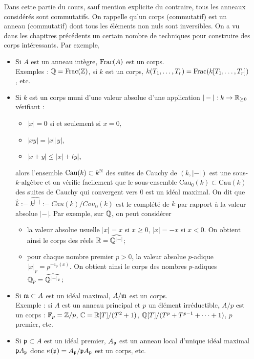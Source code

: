 \documentclass[a4paper, oneside, 12pt]{book}
\begin{document}
Dans cette partie du cours, sauf mention explicite du contraire, tous les anneaux considérés sont commutatifs. On rappelle qu'un corps (commutatif) est un anneau (commutatif) dont tous les éléments non nuls sont inversibles. On a vu dans les chapitres précédents un certain nombre de techniques pour construire des corps intéressants. Par exemple,
\begin{itemize}[leftmargin=* ,parsep=0cm,itemsep=0cm,topsep=0cm]
\item Si $A$ est un anneau intègre, $\operatorname{Frac}(A)$ est un corps.\\
Exemples : $\mathbb{Q}=\operatorname{Frac}(\mathbb{Z})$, si $k$ est un corps, $k(T_1,\dots, T_r)=\operatorname{Frac}(k[T_1,\dots, T_r])$, etc.
\item Si $k$ est un corps muni d'une valeur absolue \ie{} d'une
  application $|-|:k\rightarrow \mathbb{R}_{\geq 0}$ vérifiant :
  \begin{itemize}
  \item $|x|=0$ si et seulement si $x=0$,
  \item $|xy|=|x||y|$,
  \item $|x+y|\leq |x|+ly|$,
  \end{itemize}
  alors l'ensemble $\mathrm{Cau}(k)\subset k^{\mathbb{N}}$ des suites de Cauchy
  de $(k,|-|)$ est une sous-$k$-algèbre et on vérifie facilement que
  le sous-ensemble $\mathrm{Cau}_0(k)\subset \mathrm{Cau}(k)$ des
  suites de Cauchy qui convergent vers $0$ est un idéal maximal. On
  dit que $\widehat{k}:=\widehat{k^{|-|}}:=Cau(k)/Cau_0(k)$ est le
  complété de $k$ par rapport à la valeur absolue $|-|$. Par exemple,
  sur $\mathbb{Q}$, on peut considérer
\begin{itemize}[leftmargin=* ,parsep=0cm,itemsep=0cm,topsep=0cm]
\item la valeur absolue usuelle $|x|=x$ si $x\geq 0$, $|x|=-x$ si $x<0$. On obtient ainsi le corps des réels $\mathbb{R}=\widehat{\mathbb{Q}^{|-|}}$;
\item pour chaque nombre premier $p>0$, la valeur absolue $p$-adique
  $|x|_p=p^{-v_p(x)}$. On obtient ainsi le corps des nombres
  $p$-adiques $\mathbb{Q}_p=\widehat{\mathbb{Q}^{|-|_p}}$;
\end{itemize}
\item Si $\frak{m}\subset A$ est un idéal maximal, $A/\frak{m}$ est un corps.  \\
Exemple : si $A$ est un anneau principal et $p$ un élément
irréductible, $A/p$ est un corps : $\mathbb{F}_p=\mathbb{Z}/p$, $\mathbb{C}=\mathbb{R}[T]/(T^2+1)$, $\mathbb{Q}[T]/(T^p+T^{p-1}+\dotsb+1)$, $p$ premier, etc.
\item Si $\frak{p}\subset A$ est un idéal premier, $A_\frak{p}$ est un anneau local d'unique idéal maximal $\frak{p}A_\frak{p}$ donc $\kappa(\frak{p})=A_\frak{p}/\frak{p}A_\frak{p}$ est un corps, etc.
\end{itemize}
\end{document}
